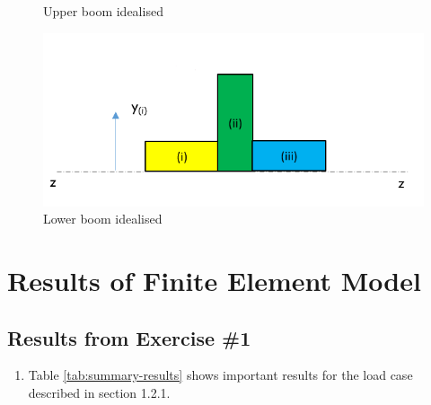 \documentclass[11pt,a4paper,oneside]{memoir}
\begin{document}
\begin{enumerate}
\begin{figure}[!hbt]
\begin{minipage}{.5\textwidth}
    \caption{Upper boom idealised}
    \label{fig:UPR-boom}
    \end{minipage}%
    \begin{minipage}{.5\textwidth}
    \centering
    \includegraphics[width = \textwidth]{figures/boom-2.png}
    \caption{Lower boom idealised}
    \label{fig:LWP-boom}
    \end{minipage}
\end{figure}
\end{enumerate}

\chapter{Results of Finite Element Model}\label{chap:results}
\section{Results from Exercise \#1}
\begin{enumerate}
	\item Table \ref{tab:summary-results} shows important results for the load case described in section 1.2.1.
\end{enumerate}
\end{document}
